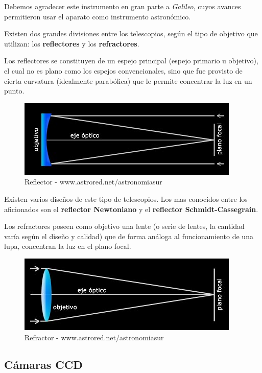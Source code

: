 \bigskip
Debemos agradecer este instrumento en gran parte a \textit{Galileo}, cuyos avances permitieron usar el aparato como instrumento astronómico. 

\bigskip
Existen dos grandes divisiones entre los telescopios, según el tipo de objetivo que utilizan: los \textbf{reflectores} y los \textbf{refractores}. 

\bigskip
Los reflectores se constituyen de un espejo principal (espejo primario u objetivo), el cual no es plano como los espejos convencionales, sino que fue provisto de cierta curvatura (idealmente parabólica) que le permite concentrar la luz en un punto.

\begin{figure}[h]
	\centering
	\includegraphics[width=0.7\linewidth]{../images/refrector}
	\caption[Telescopio]{Reflector - www.astrored.net/astronomiasur}
	\label{fig:refrector}
\end{figure}

Existen varios diseños de este tipo de telescopios. Los mas conocidos entre los aficionados son el \textbf{reflector Newtoniano} y el \textbf{reflector Schmidt-Cassegrain}. 




\bigskip
Los refractores poseen como objetivo una lente (o serie de lentes, la cantidad varía según el diseño y calidad) que de forma análoga al funcionamiento de una lupa, concentran la luz en el plano focal. 


\begin{figure}[h]
	\centering
	\includegraphics[width=0.7\linewidth]{../images/refractor}
		\caption[Telescopio]{Refractor -  www.astrored.net/astronomiasur }
	\label{fig:refrector}
\end{figure}



\subsection{Cámaras CCD}

